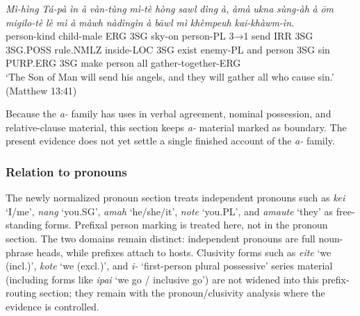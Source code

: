 \documentclass[
  11pt,
  a4paper,
]{article}
\newcommand{\tdim}[1]{\textit{#1}}
\newcommand{\tdimword}[1]{\textit{#1}}
\renewcommand{\textsc}[1]{{\footnotesize\MakeUppercase{#1}}}
\newcommand{\glossquote}[1]{`#1'}
\begin{document}
\begin{exe}
\ex \label{ex:pref-abawlmi-matt13}
\gll \tdimword{Mì-hìng} \tdimword{Tá-pà} \tdimword{ìn} \tdimword{à} \tdimword{vàn-tùng} \tdimword{mì-tè} \tdimword{hòng} \tdimword{sawl} \tdimword{dìng} \tdimword{à,} \tdimword{àmà} \tdimword{ukna} \tdimword{sùng-àh} \tdimword{à} \tdimword{ōm} \tdimword{migilo-tè} \tdimword{lè} \tdimword{mì} \tdimword{à} \tdimword{màwh} \tdimword{nàdìngìn} \tdimword{à} \tdimword{bāwl} \tdimword{mì} \tdimword{khèmpeuh} \tdimword{kai-khàwm-ìn.} \\
     person-kind child-male \textsc{erg} \textsc{3sg} sky-on person-\textsc{pl} \textsc{3→1} send \textsc{irr} \textsc{3sg} \textsc{3sg}.\textsc{poss} rule.\textsc{nmlz} inside-\textsc{loc} \textsc{3sg} exist enemy-\textsc{pl} and person \textsc{3sg} sin \textsc{purp}.\textsc{erg} \textsc{3sg} make person all gather-together-\textsc{erg} \\
\glt \glossquote{The Son of Man will send his angels, and they will gather all who cause sin.} (Matthew 13:41)
\end{exe}

Because the \tdim{a-} family has uses in verbal agreement, nominal
possession, and relative-clause material, this section keeps \tdim{a-}
material marked as boundary. The present evidence does not yet settle a
single finished account of the \tdim{a-} family.

\subsubsection{Relation to pronouns}\label{relation-to-pronouns}

The newly normalized pronoun section treats independent pronouns such as
\tdim{kei} \glossquote{I/me}, \tdim{nang} \glossquote{you.SG},
\tdim{amah} \glossquote{he/she/it}, \tdim{note} \glossquote{you.PL}, and
\tdim{amaute} \glossquote{they} as free-standing forms. Prefixal person
marking is treated here, not in the pronoun section. The two domains
remain distinct: independent pronouns are full noun-phrase heads, while
prefixes attach to hosts. Clusivity forms such as \tdim{eite}
\glossquote{we (incl.)}, \tdim{kote} \glossquote{we (excl.)}, and
\tdim{i-} \glossquote{first-person plural possessive} series material
(including forms like \tdim{ipai} \glossquote{we go / inclusive go}) are
not widened into this prefix-routing section; they remain with the
pronoun/clusivity analysis where the evidence is controlled.
\end{document}
